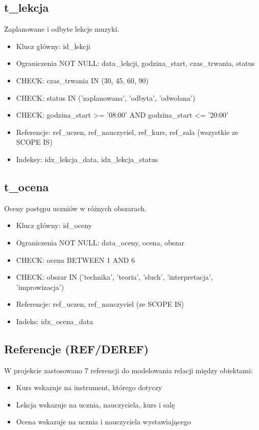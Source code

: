 \documentclass[12pt,a4paper]{article}
\begin{document}
\subsection{t\_lekcja}

Zaplanowane i odbyte lekcje muzyki.

\begin{itemize}[nosep]
    \item Klucz główny: id\_lekcji
    \item Ograniczenia NOT NULL: data\_lekcji, godzina\_start, czas\_trwania, status
    \item CHECK: czas\_trwania IN (30, 45, 60, 90)
    \item CHECK: status IN ('zaplanowana', 'odbyta', 'odwolana')
    \item CHECK: godzina\_start >= '08:00' AND godzina\_start <= '20:00'
    \item Referencje: ref\_uczen, ref\_nauczyciel, ref\_kurs, ref\_sala (wszystkie ze SCOPE IS)
    \item Indeksy: idx\_lekcja\_data, idx\_lekcja\_status
\end{itemize}

\subsection{t\_ocena}

Oceny postępu uczniów w różnych obszarach.

\begin{itemize}[nosep]
    \item Klucz główny: id\_oceny
    \item Ograniczenia NOT NULL: data\_oceny, ocena, obszar
    \item CHECK: ocena BETWEEN 1 AND 6
    \item CHECK: obszar IN ('technika', 'teoria', 'sluch', 'interpretacja', 'improwizacja')
    \item Referencje: ref\_uczen, ref\_nauczyciel (ze SCOPE IS)
    \item Indeks: idx\_ocena\_data
\end{itemize}

\subsection{Referencje (REF/DEREF)}

W projekcie zastosowano 7 referencji do modelowania relacji między obiektami:

\begin{itemize}[nosep]
    \item Kurs wskazuje na instrument, którego dotyczy
    \item Lekcja wskazuje na ucznia, nauczyciela, kurs i salę
    \item Ocena wskazuje na ucznia i nauczyciela wystawiającego
\end{itemize}
\end{document}
